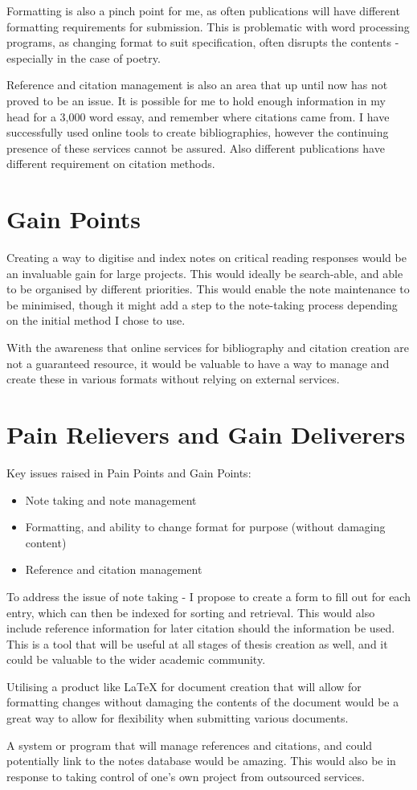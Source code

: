 \documentclass{article}
\begin{document}
Formatting is also a pinch point for me, as often publications will have different formatting requirements for submission. This is problematic with word processing programs, as changing format to suit specification, often disrupts the contents - especially in the case of poetry. 

Reference and citation management is also an area that up until now has not proved to be an issue. It is possible for me to hold enough information in my head for a 3,000 word essay, and remember where citations came from. I have successfully used online tools to create bibliographies, however the continuing presence of these services cannot be assured. Also different publications have different requirement on citation methods. 

\section{Gain Points}
Creating a way to digitise and index notes on critical reading responses would be an invaluable gain for large projects. This would ideally be search-able, and able to be organised by different priorities. This would enable the note maintenance to be minimised, though it might add a step to the note-taking process depending on the initial method I chose to use. 

With the awareness that online services for bibliography and citation creation are not a guaranteed resource, it would be valuable to have a way to manage and create these in various formats without relying on external services. 

\section{Pain Relievers and Gain Deliverers}
Key issues raised in Pain Points and Gain Points:
\begin{itemize}
    \item Note taking and note management
    \item Formatting, and ability to change format for purpose (without damaging content)
    \item Reference and citation management
\end{itemize}

To address the issue of note taking - I propose to create a form to fill out for each entry, which can then be indexed for sorting and retrieval. This would also include reference information for later citation should the information be used.
This is a tool that will be useful at all stages of thesis creation as well, and it could be valuable to the wider academic community. 

Utilising a product like LaTeX for document creation that will allow for formatting changes without damaging the contents of the document would be a great way to allow for flexibility when submitting various documents. 

A system or program that will manage references and citations, and could potentially link to the notes database would be amazing. This would also be in response to taking control of one's own project from outsourced services. 
\end{document}

